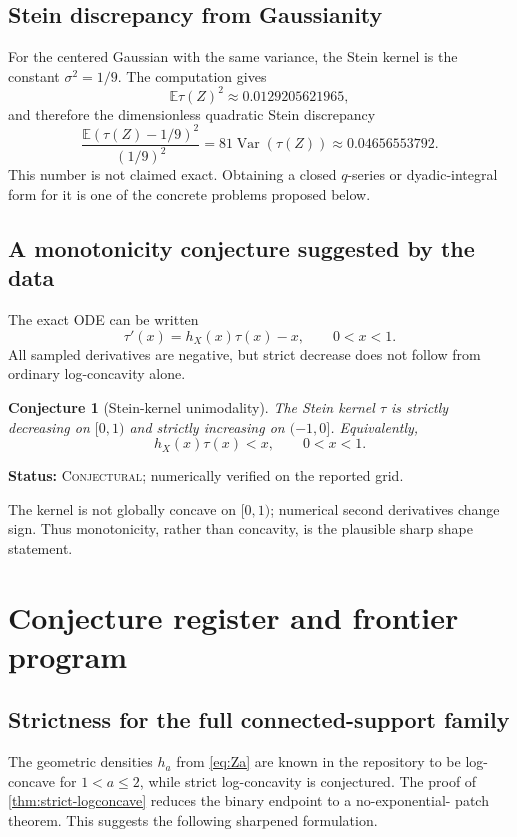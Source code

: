 \documentclass[11pt,oneside]{article}
\newtheorem{conjecture}[theorem]{Conjecture}
\theoremstyle{definition}
\theoremstyle{remark}
\newcommand{\Var}{\operatorname{Var}}
\newcommand{\E}{\mathbb E}
\newcommand{\Conjectural}{\textcolor{statusred}{\textsc{Conjectural}}}
\newcommand{\Status}[1]{\par\smallskip\noindent\textbf{Status:} #1.\par\smallskip}
\begin{document}
\subsection{Stein discrepancy from Gaussianity}
For the centered Gaussian with the same variance, the Stein kernel is the constant
$\sigma^2=1/9$.  The computation gives
\begin{equation}\label{eq:stein-discrepancy-numeric}
 \E\tau(Z)^2\approx0.0129205621965,
\end{equation}
and therefore the dimensionless quadratic Stein discrepancy
\begin{equation}\label{eq:normalized-stein-discrepancy}
 \frac{\E(\tau(Z)-1/9)^2}{(1/9)^2}
 =81\Var(\tau(Z))
 \approx0.04656553792.
\end{equation}
This number is not claimed exact.  Obtaining a closed $q$-series or dyadic-integral
form for it is one of the concrete problems proposed below.

\subsection{A monotonicity conjecture suggested by the data}
The exact ODE can be written
\begin{equation}\label{eq:tau-hazard-ode}
 \tau'(x)=h_X(x)\tau(x)-x,
 \qquad 0<x<1.
\end{equation}
All sampled derivatives are negative, but strict decrease does not follow from
ordinary log-concavity alone.

\begin{conjecture}[Stein-kernel unimodality]\label{conj:tau-monotone}
The Stein kernel $\tau$ is strictly decreasing on $[0,1)$ and strictly increasing
on $(-1,0]$.  Equivalently,
\begin{equation}
 h_X(x)\tau(x)<x,
 \qquad 0<x<1.
\end{equation}
\end{conjecture}
\Status{\Conjectural; numerically verified on the reported grid}

The kernel is not globally concave on $[0,1)$; numerical second derivatives change
sign.  Thus monotonicity, rather than concavity, is the plausible sharp shape
statement.

\section{Conjecture register and frontier program}

\subsection{Strictness for the full connected-support family}
The geometric densities $h_a$ from \eqref{eq:Za} are known in the repository to
be log-concave for $1<a\le2$, while strict log-concavity is conjectured.  The proof
of \cref{thm:strict-logconcave} reduces the binary endpoint to a no-exponential-
patch theorem.  This suggests the following sharpened formulation.
\end{document}
